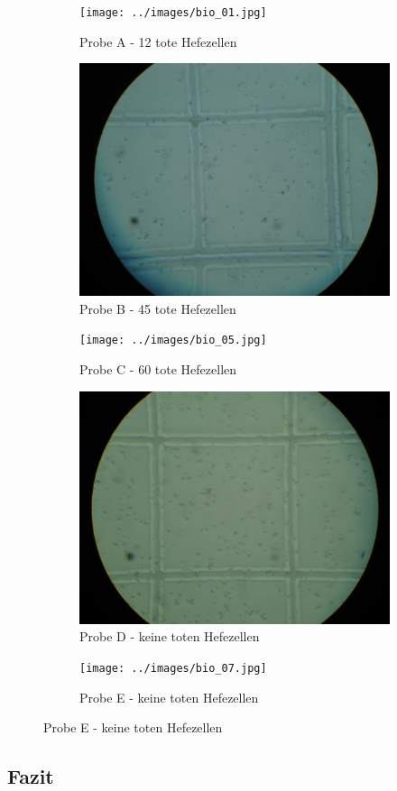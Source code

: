 \begin{figure}[h!]
	\centering
	\begin{subfigure}[b]{0.45\textwidth}
		\texttt{[image: ../images/bio\_01.jpg]}
		\caption{Probe A - 12 tote Hefezellen}
	\end{subfigure}
	\begin{subfigure}[b]{0.45\textwidth}
		\includegraphics[width=1\textwidth]{../images/bio_04.jpg}
		\caption{Probe B - 45 tote Hefezellen}
	\end{subfigure}

	\begin{subfigure}[b]{0.45\textwidth}
		\texttt{[image: ../images/bio\_05.jpg]}
		\caption{Probe C - 60 tote Hefezellen}
	\end{subfigure}
	\begin{subfigure}[b]{0.45\textwidth}
		\includegraphics[width=1\textwidth]{../images/bio_06.jpg}
		\caption{Probe D - keine toten Hefezellen}
	\end{subfigure}

	\begin{subfigure}[b]{0.45\textwidth}
		\texttt{[image: ../images/bio\_07.jpg]}
		\caption{Probe E - keine toten Hefezellen}
	\end{subfigure}
\end{figure}

\newpage
\clearpage
\subsection{Fazit}
